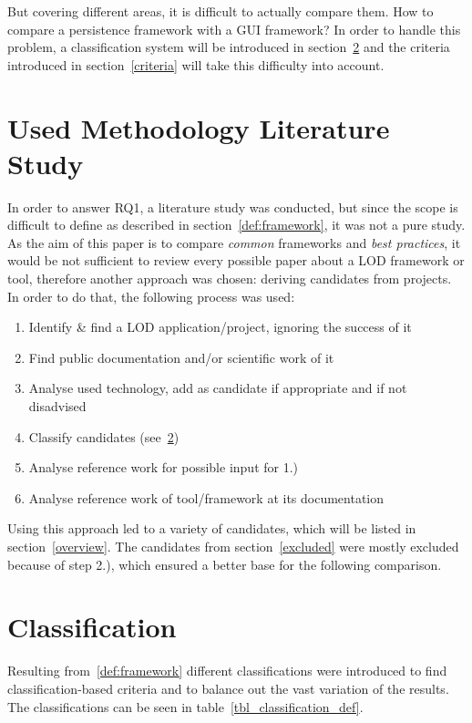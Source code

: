 But covering different areas, it is difficult to actually compare them. How to compare a persistence framework with a GUI framework? In order to handle this problem, a classification system will be introduced in section~\ref{classification} and the criteria introduced in section~\ref{criteria} will take this difficulty into account.

\section{Used Methodology Literature Study}\label{meth_study}
In order to answer RQ1, a literature study was conducted, but since the scope is difficult to define as described in section~\ref{def:framework}, it was not a pure study. As the aim of this paper is to compare \textit{common} frameworks and \textit{best practices}, it would be not sufficient to review every possible paper about a LOD framework or tool, therefore another approach was chosen: deriving candidates from projects. In order to do that, the following process was used:

\begin{enumerate}
\item Identify \& find a LOD application/project, ignoring the success of it
\item Find public documentation and/or scientific work of it
\item Analyse used technology, add as candidate if appropriate and if not disadvised
\item Classify candidates (see~\ref{classification})
\item Analyse reference work for possible input for 1.)
\item Analyse reference work of tool/framework at its documentation
\end{enumerate}

Using this approach led to a variety of candidates, which will be listed in section~\ref{overview}. The candidates from section~\ref{excluded} were mostly excluded because of step 2.), which ensured a better base for the following comparison.

\section{Classification}\label{classification}
Resulting from~\ref{def:framework} different classifications were introduced to find classification-based criteria and to balance out the vast variation of the results. The classifications can be seen in table~\ref{tbl_classification_def}.

